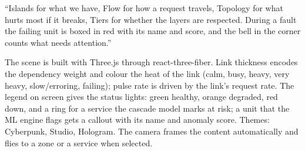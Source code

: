 \begin{saybox}
``Islands for what we have, Flow for how a request travels, Topology for what hurts most if it breaks, Tiers for whether the layers are respected. During a fault the failing unit is boxed in red with its name and score, and the bell in the corner counts what needs attention.''
\end{saybox}

\begin{techbox}
The scene is built with Three.js through react-three-fiber. Link thickness encodes the dependency weight and colour the heat of the link (calm, busy, heavy, very heavy, slow/erroring, failing); pulse rate is driven by the link's request rate. The legend on screen gives the status lights: green healthy, orange degraded, red down, and a ring for a service the cascade model marks at risk; a unit that the ML engine flags gets a callout with its name and anomaly score. Themes: Cyberpunk, Studio, Hologram. The camera frames the content automatically and flies to a zone or a service when selected.
\end{techbox}

